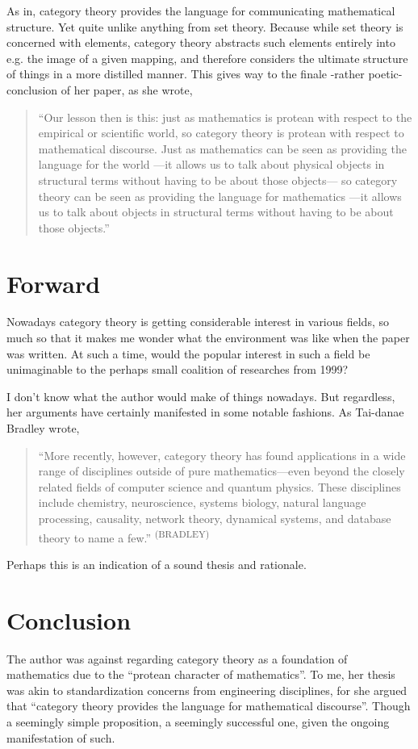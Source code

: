 As in, category theory provides the language for communicating mathematical structure. Yet quite unlike anything from set theory. Because while set theory is concerned with elements, category theory abstracts such elements entirely into e.g. the image of a given mapping, and therefore considers the ultimate structure of things in a more distilled manner. This gives way to the finale -rather poetic- conclusion of her paper, as she wrote,
\begin{quotation}
``Our lesson then is this: just as mathematics is protean with respect to the empirical or scientific world, so category theory is protean with respect to mathematical discourse. Just as mathematics can be seen as providing the language for the world —it allows us to talk about physical objects in structural terms without having to be about those objects— so category theory can be seen as providing the language for mathematics —it allows us to talk about objects in structural terms without having to be about those objects.''
\end{quotation}

\section*{Forward}

Nowadays category theory is getting considerable interest in various fields, so much so that it makes me wonder what the environment was like when the paper was written. At such a time, would the popular interest in such a field be unimaginable to the perhaps small coalition of researches from 1999?

I don’t know what the author would make of things nowadays. But regardless, her arguments have certainly manifested in some notable fashions. As Tai-danae Bradley wrote,
\begin{quotation}
``More recently, however, category theory has found applications in a wide range of disciplines outside of pure mathematics—even beyond the closely related fields of computer science and quantum physics. These disciplines include chemistry, neuroscience, systems biology, natural language processing, causality, network theory, dynamical systems, and database theory to name a few.'' \textsuperscript{(BRADLEY)}
\end{quotation}

Perhaps this is an indication of a sound thesis and rationale. 


\section*{Conclusion}

The author was against regarding category theory as a foundation of mathematics due to the ``protean character of mathematics''. To me, her thesis was akin to standardization concerns from engineering disciplines, for she argued that ``category theory provides the language for mathematical discourse''. Though a seemingly simple proposition, a seemingly successful one, given the ongoing manifestation of such.